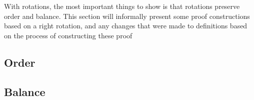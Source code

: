 With rotations, the most important things to show is that rotations preserve order and balance. This section will informally present some proof constructions based on a right rotation, and any changes that were made to definitions based on the process of constructing these proof

\subsection*{Order}


\subsection*{Balance}

